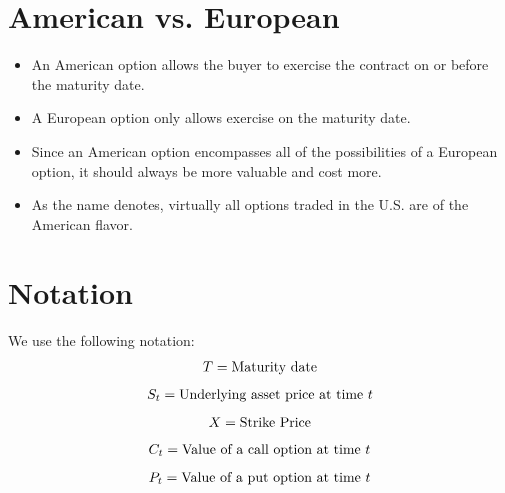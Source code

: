\documentclass[letterpaper,10pt,english]{sphinxmanual}
\begin{document}
\section{American vs. European}
\label{options:american-vs-european}\begin{itemize}
\item {} 
An American option allows the buyer to exercise the contract on or
before the maturity date.

\end{itemize}
\begin{itemize}
\item {} 
A European option only allows exercise on the maturity date.

\end{itemize}
\begin{itemize}
\item {} 
Since an American option encompasses all of the possibilities of a
European option, it should always be more valuable and cost more.

\end{itemize}
\begin{itemize}
\item {} 
As the name denotes, virtually all options traded in the U.S. are of
the American flavor.

\end{itemize}


\section{Notation}
\label{options:notation}
We use the following notation:
\begin{gather}
\begin{split}T = \text{Maturity date}\end{split}\notag
\end{gather}\begin{gather}
\begin{split}S_t = \text{Underlying asset price at time } t\end{split}\notag
\end{gather}\begin{gather}
\begin{split}X = \text{Strike Price}\end{split}\notag
\end{gather}\begin{gather}
\begin{split}C_t = \text{Value of a call option at time } t\end{split}\notag
\end{gather}\begin{gather}
\begin{split}P_t = \text{Value of a put option at time } t\end{split}\notag
\end{gather}
\end{document}
